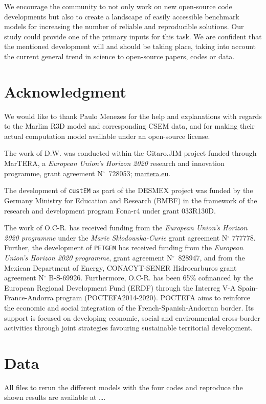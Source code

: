 \documentclass[
    paper,
  ]{geophysics}
\newcommand{\custem}{\texttt{custEM}\xspace}
\newcommand{\petgem}{\texttt{PETGEM}\xspace}
\newcommand{\itodo}[1]{\todo[inline]{\sffamily #1}}
\begin{document}
We encourage the community to not only work on new open-source code
developments but also to create a landscape of easily accessible benchmark
models for increasing the number of reliable and reproducible solutions. Our
study could provide one of the primary inputs for this task. We are confident
that the mentioned development will and should be taking place, taking into
account the current general trend in science to open-source papers, codes or
data.




\section{Acknowledgment}


We would like to thank Paulo Menezes for the help and explanations with regards to the Marlim R3D model and corresponding CSEM data, and for making their actual computation model available under an open-source license.

The work of D.W. was conducted within the Gitaro.JIM project funded through MarTERA, a \emph{European Union's Horizon 2020} research and innovation programme, grant agreement N$^\circ$~728053; \href{https://www.martera.eu}{martera.eu}.

The development of \custem as part of the DESMEX project was funded by the Germany Ministry for Education and Research (BMBF) in the framework of the research and development program Fona-r4 under grant 033R130D.

The work of O.C-R. has received funding from the \emph{European Union's Horizon 2020 programme} under the \emph{Marie Sklodowska-Curie} grant agreement N$^\circ$ 777778. Further, the development of \petgem has received funding from the \emph{European Union's Horizon 2020 programme}, grant agreement N$^\circ$~828947, and from the Mexican Department of Energy, CONACYT-SENER Hidrocarburos grant agreement N$^\circ$ B-S-69926. Furthermore, O.C-R. has been 65\% cofinanced by the European Regional Development Fund (ERDF) through the Interreg V-A Spain-France-Andorra program (POCTEFA2014-2020). POCTEFA aims to reinforce the economic and social integration of the French-Spanish-Andorran border. Its support is focused on developing economic, social and environmental cross-border activities through joint strategies favouring sustainable territorial development.


\section{Data}

All files to rerun the different models with the four codes and reproduce the shown results are available at \dots.
\itodo{Put up on Zenodo, link here.}



\end{document}

